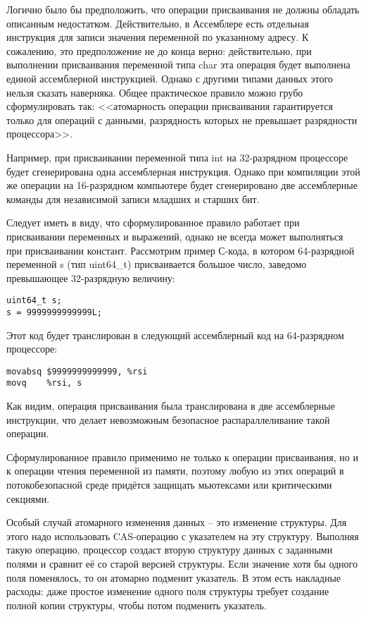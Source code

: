 Логично было бы предположить, что операции присваивания не должны обладать описанным недостатком. Действительно, в Ассемблере есть отдельная инструкция для записи значения переменной по указанному адресу. К сожалению, это предположение не до конца верно: действительно, при выполнении присваивания переменной типа char эта операция будет выполнена единой ассемблерной инструкцией. Однако с другими типами данных этого нельзя сказать наверняка. Общее практическое правило можно грубо сформулировать так: <<атомарность операции присваивания гарантируется только для операций с данными, разрядность которых не превышает разрядности процессора>>. 

Например, при присваивании переменной типа int на 32-разрядном процессоре будет сгенерирована одна ассемблерная инструкция. Однако при компиляции этой же операции на 16-разрядном компьютере будет сгенерировано две ассемблерные команды для независимой записи младших и старших бит.

Следует иметь в виду, что сформулированное правило работает при присваивании переменных и выражений, однако не всегда может выполняться при присваивании констант. Рассмотрим пример С-кода, в котором 64-разрядной переменной s (тип uint64\_t) присваивается большое число, заведомо превышающее 32-разрядную величину:

\begin{verbatim}
uint64_t s;
s = 9999999999999L;
\end{verbatim}

Этот код будет транслирован в следующий ассемблерный код на 64-разрядном процессоре:

\begin{verbatim}
movabsq $9999999999999, %rsi
movq	%rsi, s
\end{verbatim}

Как видим, операция присваивания была транслирована в две ассемблерные инструкции, что делает невозможным безопасное распараллеливание такой операции.

Сформулированное правило применимо не только к операции присваивания, но и к операции чтения переменной из памяти, поэтому любую из этих операций в потокобезопасной среде придётся защищать мьютексами или критическими секциями.

Особый случай атомарного изменения данных -- это изменение структуры. Для этого надо использовать CAS-операцию с указателем на эту структуру. Выполняя такую операцию, процессор создаст вторую структуру данных с заданными полями и сравнит её со старой версией структуры. Если значение хотя бы одного поля поменялось, то он атомарно подменит указатель. В этом есть накладные расходы: даже простое изменение одного поля структуры требует создание полной копии структуры, чтобы потом подменить указатель.
